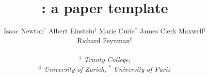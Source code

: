 \title{\sys: a paper template}

\ifdefined\DRAFT
 \pagestyle{fancyplain}
\fi


\author{
 Isaac Newton$^\dagger$\; 
 Albert Einstein$^\ddagger$\;
 Marie Curie$^\ast$\;
 James Clerk Maxwell$^\dagger$\;
\\
 Richard Feynman$^\dagger$\;
\\\\
 \emph{$^\dagger$  Trinity College}, \\
 \emph{$^\ddagger$ University of Zurich}, 
 \emph{$^\ast$ 	 University of Paris}
}

